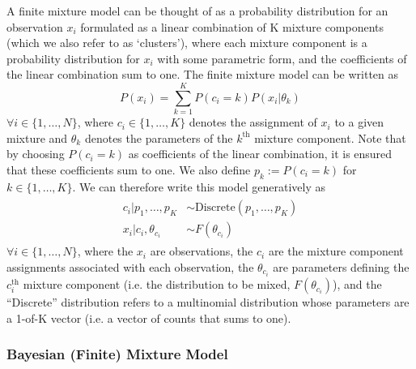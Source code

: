 \documentclass[smallcondensed, final]{svjour3}
\begin{document}
A finite mixture model can be thought of as a probability distribution for an observation $x_{i}$ formulated as a linear combination of K mixture components (which we also refer to as `clusters'), where each mixture component is a probability distribution for $x_{i}$ with some parametric form, and the coefficients of the linear combination sum to one. The finite mixture model can be written as
\begin{equation}
P(x_{i}) = \sum_{k=1}^{K} P(c_{i} = k)P(x_{i}|\theta_{k})
\end{equation}
$\forall i \in \{ 1, \ldots, N \}$, where $c_{i} \in \{ 1, \ldots, K \}$ denotes the assignment of $x_{i}$ to a given mixture and $\theta_{k}$ denotes the parameters of the $k^{\text{th}}$ mixture component. Note that by choosing $P(c_{i} = k)$ as coefficients of the linear combination, it is ensured that these coefficients sum to one. We also define $p_{k} := P(c_{i} = k)$ for $k \in \{ 1, \ldots, K \} $. We can therefore write this model generatively as
\begin{align}
\begin{split}
	c_{i}|p_{1}, \ldots, p_{K}  &\sim  \text{Discrete}(p_{1}, \ldots, p_{K}) \\
	x_{i}|c_{i}, \theta_{c_{i}}  &\sim  F(\theta_{c_{i}})
\end{split}
\end{align}
$\forall i \in \{ 1, \ldots, N \}$, where the $x_{i}$ are observations, the $c_{i}$ are the mixture component assignments associated with each observation, the $\theta_{c_{i}}$ are parameters defining the $c_{i}^{\text{th}}$ mixture component (i.e. the distribution to be mixed, $F(\theta_{c_{i}})$), and the ``Discrete'' distribution refers to a multinomial distribution whose parameters are a 1-of-K vector (i.e. a vector of counts that sums to one).






\subsubsection{Bayesian (Finite) Mixture Model}
\label{sec:bayesian_mixture}
\end{document}
